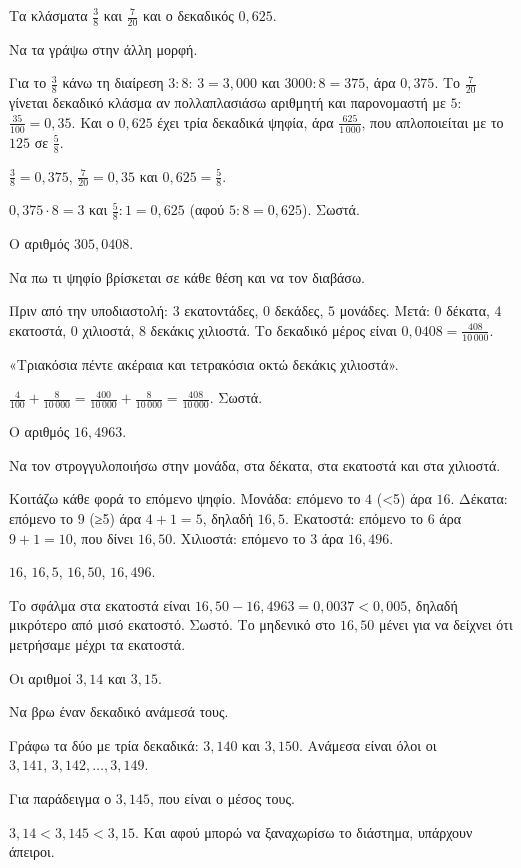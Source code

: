 \tixero Τα κλάσματα $\frac{3}{8}$ και $\frac{7}{20}$ και ο δεκαδικός $0{,}625$.\par
\tithelo Να τα γράψω στην άλλη μορφή.\par
\possindeo Για το $\frac{3}{8}$ κάνω τη διαίρεση $3:8$: $3=3{,}000$ και $3000:8=375$, άρα $0{,}375$. Το $\frac{7}{20}$ γίνεται δεκαδικό κλάσμα αν πολλαπλασιάσω αριθμητή και παρονομαστή με $5$: $\frac{35}{100}=0{,}35$. Και ο $0{,}625$ έχει τρία δεκαδικά ψηφία, άρα $\frac{625}{1\,000}$, που απλοποιείται με το $125$ σε $\frac{5}{8}$.\par
\apantisi $\frac{3}{8}=0{,}375$, $\frac{7}{20}=0{,}35$ και $0{,}625=\frac{5}{8}$.\par
\elegxos $0{,}375\cdot 8=3$ και $\frac{5}{8}:1=0{,}625$ (αφού $5:8=0{,}625$). Σωστά.

\tixero Ο αριθμός $305{,}0408$.\par
\tithelo Να πω τι ψηφίο βρίσκεται σε κάθε θέση και να τον διαβάσω.\par
\possindeo Πριν από την υποδιαστολή: $3$ εκατοντάδες, $0$ δεκάδες, $5$ μονάδες. Μετά: $0$ δέκατα, $4$ εκατοστά, $0$ χιλιοστά, $8$ δεκάκις χιλιοστά. Το δεκαδικό μέρος είναι $0{,}0408=\frac{408}{10\,000}$.\par
\apantisi «Τριακόσια πέντε ακέραια και τετρακόσια οκτώ δεκάκις χιλιοστά».\par
\elegxos $\frac{4}{100}+\frac{8}{10\,000}=\frac{400}{10\,000}+\frac{8}{10\,000}=\frac{408}{10\,000}$. Σωστά.

\tixero Ο αριθμός $16{,}4963$.\par
\tithelo Να τον στρογγυλοποιήσω στην μονάδα, στα δέκατα, στα εκατοστά και στα χιλιοστά.\par
\possindeo Κοιτάζω κάθε φορά το επόμενο ψηφίο. Μονάδα: επόμενο το $4$ (<5) άρα $16$. Δέκατα: επόμενο το $9$ (≥5) άρα $4+1=5$, δηλαδή $16{,}5$. Εκατοστά: επόμενο το $6$ άρα $9+1=10$, που δίνει $16{,}50$. Χιλιοστά: επόμενο το $3$ άρα $16{,}496$.\par
\apantisi $16$, $16{,}5$, $16{,}50$, $16{,}496$.\par
\elegxos Το σφάλμα στα εκατοστά είναι $16{,}50-16{,}4963=0{,}0037<0{,}005$, δηλαδή μικρότερο από μισό εκατοστό. Σωστό. Το μηδενικό στο $16{,}50$ μένει για να δείχνει ότι μετρήσαμε μέχρι τα εκατοστά.

\tixero Οι αριθμοί $3{,}14$ και $3{,}15$.\par
\tithelo Να βρω έναν δεκαδικό ανάμεσά τους.\par
\possindeo Γράφω τα δύο με τρία δεκαδικά: $3{,}140$ και $3{,}150$. Ανάμεσα είναι όλοι οι $3{,}141,\,3{,}142,\dots,3{,}149$.\par
\apantisi Για παράδειγμα ο $3{,}145$, που είναι ο μέσος τους.\par
\elegxos $3{,}14<3{,}145<3{,}15$. Και αφού μπορώ να ξαναχωρίσω το διάστημα, υπάρχουν άπειροι.

